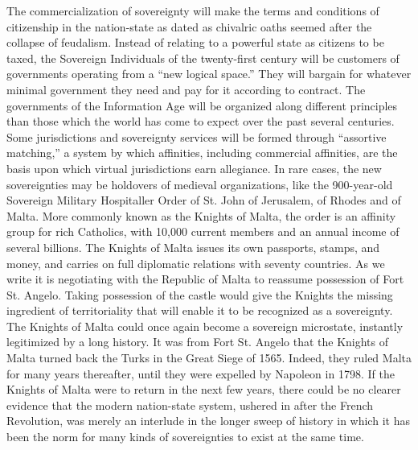 \begin{paracol}{2}[]
\switchcolumn
The commercialization of sovereignty will make the terms and conditions of citizenship in the nation-state as dated as chivalric oaths seemed after the collapse of feudalism. Instead of relating to a powerful state as citizens to be taxed, the Sovereign Individuals of the twenty-first century will be customers of governments operating from a ``new logical space.'' They will bargain for whatever minimal government they need and pay for it according to contract. The governments of the Information Age will be organized along different principles than those which the world has come to expect over the past several centuries. Some jurisdictions and sovereignty services will be formed through ``assortive matching,'' a system by which affinities, including commercial affinities, are the basis upon which virtual jurisdictions earn allegiance. In rare cases, the new sovereignties may be holdovers of medieval organizations, like the 900-year-old Sovereign Military Hospitaller Order of St. John of Jerusalem, of Rhodes and of Malta. More commonly known as the Knights of Malta, the order is an affinity group for rich Catholics, with 10,000 current members and an annual income of several billions. The Knights of Malta issues its own passports, stamps, and money, and carries on full diplomatic relations with seventy countries. As we write it is negotiating with the Republic of Malta to reassume possession of Fort St. Angelo. Taking possession of the castle would give the Knights the missing ingredient of territoriality that will enable it to be recognized as a sovereignty. The Knights of Malta could once again become a sovereign microstate, instantly legitimized by a long history. It was from Fort St. Angelo that the Knights of Malta turned back the Turks in the Great Siege of 1565. Indeed, they ruled Malta for many years thereafter, until they were expelled by Napoleon in 1798. If the Knights of Malta were to return in the next few years, there could be no clearer evidence that the modern nation-state system, ushered in after the French Revolution, was merely an interlude in the longer sweep of history in which it has been the norm for many kinds of sovereignties to exist at the same time.


\end{paracol}
